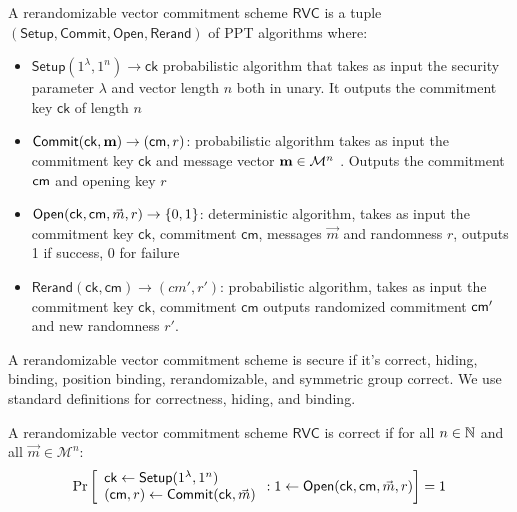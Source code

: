 \begin{definition} 
    A rerandomizable vector commitment scheme $\mathsf{RVC}$ is a tuple $(\mathsf{Setup}, \mathsf{Commit}, \mathsf{Open}, \mathsf{Rerand})$ of PPT algorithms where:
    
    \begin{itemize}
        \item $\mathsf{Setup}(1^\lambda, 1^n) \to \mathsf{ck}$ probabilistic algorithm that takes as input the security parameter $\lambda$ and vector length $n$ both in unary. It outputs the commitment key $\mathsf{ck}$ of length $n$
        
        \item $\mathsf{Commit}(\mathsf{ck}, \textbf{m}) \to (\mathsf{cm}, r)$: probabilistic algorithm takes as input the commitment key $\mathsf{ck}$ and message vector $\textbf{m} \in \mathcal{M}^n$ . Outputs the commitment $\mathsf{cm}$ and opening key $r$

        \item $\mathsf{Open}(\mathsf{ck, cm}, \vec{m}, r) \to \{0,1\}$: deterministic algorithm, takes as input the commitment key $\mathsf{ck}$, commitment $\mathsf{cm}$, messages $\vec{m}$ and randomness $r$, outputs 1 if success, 0 for failure

        \item $\mathsf{Rerand}(\mathsf{ck, cm}) \to (cm', r')$: probabilistic algorithm, takes as input the commitment key $\mathsf{ck}$, commitment $\mathsf{cm}$ outputs randomized commitment $\mathsf{cm}'$ and new randomness $r'$. 
        
    \end{itemize}
\end{definition}

\noindent A rerandomizable vector commitment scheme is secure if it's correct, hiding, binding, position binding, rerandomizable, and symmetric group correct. We use standard definitions for correctness, hiding, and binding.


\begin{definition}[Correctness] A rerandomizable vector commitment scheme $\mathsf{RVC}$ is correct if for all $n \in \mathbb{N}$ and all $\vec{m} \in \mathcal{M}^n$:
        \[
        \Pr
            \left [
                \begin{array}{l}
                    \mathsf{ck} \gets \mathsf{Setup}(1^\lambda, 1^n) \\
                    (\mathsf{cm}, r) \gets \mathsf{Commit}(\mathsf{ck}, \vec{m}) \\
                \end{array}
                : 1 \gets \mathsf{Open}(\mathsf{ck}, \mathsf{cm}, \vec{m}, r)
            \right ] = 1
    \]
\end{definition}



